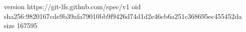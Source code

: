version https://git-lfs.github.com/spec/v1
oid sha256:9820167cde9b39afa79010bb9f9426d74d1d2e46cb6a251c368695ec455452da
size 167595
